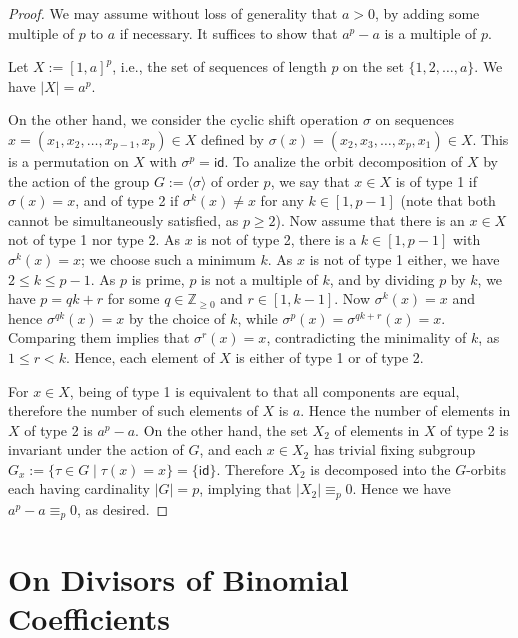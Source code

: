 ﻿\documentclass{article}
\theoremstyle{definition}
\begin{document}
\begin{proof}
    We may assume without loss of generality that $a > 0$, by adding some multiple of $p$ to $a$ if necessary.
    It suffices to show that $a^p - a$ is a multiple of $p$.

    Let $X := [1,a]^p$, i.e., the set of sequences of length $p$ on the set $\{ 1, 2, \dots, a\}$.
    We have $|X| = a^p$.

    On the other hand, we consider the cyclic shift operation $\sigma$ on sequences $x = (x_1,x_2,\dots,x_{p-1},x_p) \in X$ defined by $\sigma(x) = (x_2,x_3,\dots,x_p,x_1) \in X$.
    This is a permutation on $X$ with $\sigma^p = \mathsf{id}$.
    To analize the orbit decomposition of $X$ by the action of the group $G := \langle \sigma \rangle$ of order $p$, we say that $x \in X$ is of type 1 if $\sigma(x) = x$, and of type 2 if $\sigma^k(x) \neq x$ for any $k \in [1,p-1]$ (note that both cannot be simultaneously satisfied, as $p \geq 2$).
    Now assume that there is an $x \in X$ not of type 1 nor type 2.
    As $x$ is not of type 2, there is a $k \in [1,p-1]$ with $\sigma^k(x) = x$; we choose such a minimum $k$.
    As $x$ is not of type 1 either, we have $2 \leq k \leq p-1$.
    As $p$ is prime, $p$ is not a multiple of $k$, and by dividing $p$ by $k$, we have $p = qk + r$ for some $q \in \mathbb{Z}_{\geq 0}$ and $r \in [1,k-1]$.
    Now $\sigma^k(x) = x$ and hence $\sigma^{qk}(x) = x$ by the choice of $k$, while $\sigma^p(x) = \sigma^{qk+r}(x) = x$.
    Comparing them implies that $\sigma^r(x) = x$, contradicting the minimality of $k$, as $1 \leq r < k$.
    Hence, each element of $X$ is either of type 1 or of type 2.

    For $x \in X$, being of type 1 is equivalent to that all components are equal, therefore the number of such elements of $X$ is $a$.
    Hence the number of elements in $X$ of type 2 is $a^p - a$.
    On the other hand, the set $X_2$ of elements in $X$ of type 2 is invariant under the action of $G$, and each $x \in X_2$ has trivial fixing subgroup $G_x := \{ \tau \in G \mid \tau(x) = x \} = \{\mathsf{id}\}$.
    Therefore $X_2$ is decomposed into the $G$-orbits each having cardinality $|G| = p$, implying that $|X_2| \equiv_p 0$.
    Hence we have $a^p - a \equiv_p 0$, as desired.
\end{proof}


\section{On Divisors of Binomial Coefficients}
\end{document}
